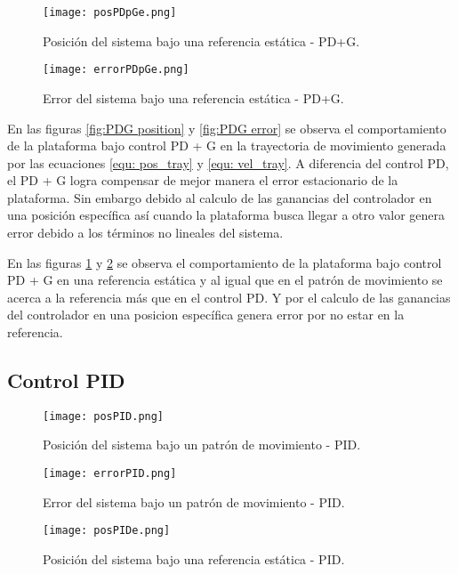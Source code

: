 \begin{figure}[H]
    \centering
    \texttt{[image: posPDpGe.png]}
    \caption{Posición del sistema bajo una referencia estática - PD+G.}
    \label{fig:PDG positione}
\end{figure}

\begin{figure}[H]
    \centering
    \texttt{[image: errorPDpGe.png]}
    \caption{Error del sistema bajo una referencia estática - PD+G.}
    \label{fig:PDG errore}
\end{figure}

En las figuras \ref{fig:PDG position} y \ref{fig:PDG error} se observa el comportamiento de la plataforma bajo control PD + G en la trayectoria de movimiento generada por las ecuaciones \ref{equ: pos_tray} y \ref{equ: vel_tray}. A diferencia del control PD, el PD + G logra compensar de mejor manera el error estacionario de la plataforma. Sin embargo debido al calculo de las ganancias del controlador en una posición específica así cuando la plataforma busca llegar a otro valor genera error debido a los términos no lineales del sistema.

En las figuras \ref{fig:PDG positione} y \ref{fig:PDG errore} se observa el comportamiento de la plataforma bajo control PD + G en una referencia estática y al igual que en el patrón de movimiento se acerca a la referencia más que en el control PD. Y por el calculo de las ganancias del controlador en una posicion específica genera error por no estar en la referencia.

\subsection{Control PID}

\begin{figure}[H]
    \centering
    \texttt{[image: posPID.png]}
    \caption{Posición del sistema bajo un patrón de movimiento - PID.}
    \label{fig:PID position}
\end{figure}

\begin{figure}[H]
    \centering
    \texttt{[image: errorPID.png]}
    \caption{Error del sistema bajo un patrón de movimiento - PID.}
    \label{fig:PID error}
\end{figure}

\begin{figure}[H]
    \centering
    \texttt{[image: posPIDe.png]}
    \caption{Posición del sistema bajo una referencia estática - PID.}
    \label{fig:PID positione}
\end{figure}

